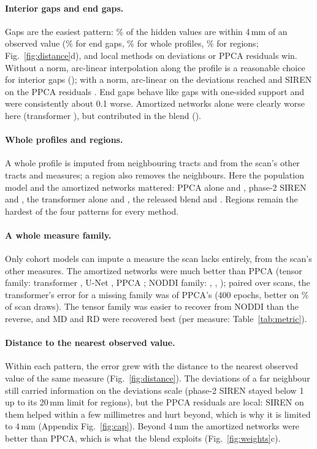 \documentclass[11pt]{article}
\begin{document}
\paragraph{Interior gaps and end gaps.} Gaps are the easiest pattern: \shareFourGap\% of the hidden values are within 4\,mm of an observed
value (\shareFourEnd\% for end gaps, \shareFourWhole\% for whole profiles, \shareFourRegion\% for regions;
Fig.~\ref{fig:distance}d), and local methods on deviations or PPCA residuals win. Without a norm, arc-linear
interpolation along the profile is a reasonable choice for interior gaps (\rPoneArcGap{}); with a norm, arc-linear
on the deviations reached \rPtwoArcGap{} and SIREN on the PPCA residuals \rDefaultGap{}. End gaps behave like gaps
with one-sided support and were consistently about 0.1 worse. Amortized networks alone were clearly worse here
(transformer \rTfFourGap{}), but contributed in the blend (\rFinalGap{}).

\paragraph{Whole profiles and regions.} A whole profile is imputed from neighbouring tracts and from the scan's other
tracts and measures; a region also removes the neighbours. Here the population model and the amortized networks
mattered: PPCA alone \rPpcaWhole{} and \rPpcaRegion{}, phase-2 SIREN \rPtwoSirenWhole{} and \rPtwoSirenRegion{}, the
transformer alone \rTfFourWhole{} and \rTfFourRegion{}, the released blend \rFinalWhole{} and \rFinalRegion{}. Regions
remain the hardest of the four patterns for every method.

\paragraph{A whole measure family.} Only cohort models can impute a measure the scan lacks entirely, from the
scan's other measures. The amortized networks were much better than PPCA (tensor family: transformer \rTfFourWdti{},
U-Net \rUnetWdti{}, PPCA \rPpcaWdti{}; NODDI family: \rTfFourWnoddi{}, \rUnetWnoddi{}, \rPpcaWnoddi{}); paired over
scans, the transformer's error for a missing family was \wCRatio{} of PPCA's (400 epochs, better on \wCBetter\% of scan
draws). The tensor family was easier to recover from NODDI than the reverse, and MD and RD were recovered best (per
measure: Table~\ref{tab:metric}).

\paragraph{Distance to the nearest observed value.} Within each pattern, the error grew with the distance to the nearest
observed value of the same measure (Fig.~\ref{fig:distance}). The deviations of a far neighbour still carried
information on the deviations scale (phase-2 SIREN stayed below 1 up to its 20\,mm limit for regions), but the PPCA residuals
are local: SIREN on them helped within a few millimetres and hurt beyond, which is why it is limited to 4\,mm
(Appendix Fig.~\ref{fig:cap}). Beyond 4\,mm the amortized networks were better than PPCA, which is what the blend
exploits (Fig.~\ref{fig:weights}c).
\end{document}
